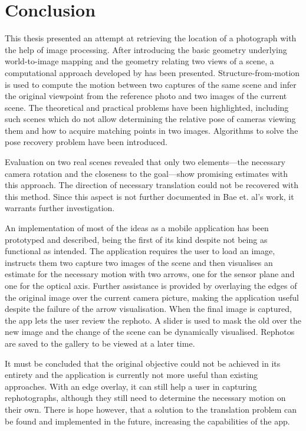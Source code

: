 \chapter{Conclusion}

This thesis presented an attempt at retrieving the location of a photograph with
the help of image processing. After introducing the basic geometry underlying
world-to-image mapping and the geometry relating two views of a scene, a
computational approach developed by \citet{bae2010} has been presented.
Structure-from-motion is used to compute the motion between two captures of the
same scene and infer the original viewpoint from the reference photo and two
images of the current scene.  The theoretical and practical problems have been
highlighted, including such scenes which do not allow determining the relative
pose of cameras viewing them and how to acquire matching points in two images.
Algorithms to solve the pose recovery problem have been introduced.

Evaluation on two real scenes revealed that only two elements---the necessary
camera rotation and the closeness to the goal---show promising estimates with
this approach. The direction of necessary translation could not be recovered
with this method.  Since this
aspect is not further documented in Bae et. al's work, it warrants further
investigation.

An implementation of most of the ideas as a mobile application has been
prototyped and described, being the first of its kind despite not being as
functional as intended. The application requires the user to load an image,
instructs them two capture two images of the scene and then visualises an
estimate for the necessary motion with two arrows, one for the sensor plane and
one for the optical axis. Further assistance is provided by overlaying the edges
of the original image over the current camera picture, making the application
useful despite the failure of the arrow visualisation.  When the final image is
captured, the app lets the user review the rephoto. A slider is used to mask the
old over the new image and the change of the scene can be dynamically
visualised. Rephotos are saved to the gallery to be viewed at a later time.

It must be concluded that the original objective could not be achieved in its
entirety and
the application is currently not more useful than existing approaches. With an edge
overlay, it can still help a user in capturing rephotographs, although they
still need to determine the necessary motion on their own. There is hope
however, that a solution to the translation problem can be found and
implemented in the future, increasing the capabilities of the app.

